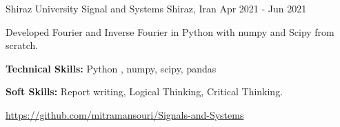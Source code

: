\begin{cventries}
  \cventry
    {Shiraz University} %
    {Signal and Systems} %
    {Shiraz, Iran} %
    {Apr 2021 - Jun 2021} %
    {
      \begin{cvitems} %
        \item {Developed Fourier and Inverse Fourier in Python with numpy and Scipy from scratch.}
        \item {\textbf{Technical Skills:} Python , numpy, scipy, pandas}
        \item {\textbf{Soft Skills:} Report writing, Logical Thinking, Critical Thinking.}
        \item {\hyperlink{Link:}{https://github.com/mitramansouri/Signals-and-Systems}}
      \end{cvitems}
    }


\end{cventries}
